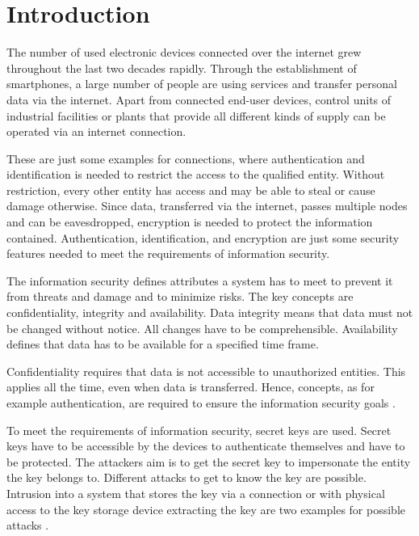 \chapter{Introduction}
\label{cap:introduction}

The number of used electronic devices connected over the internet grew throughout the last two decades rapidly.
Through the establishment of smartphones, a large number of people are using services and transfer personal data via the internet. %
Apart from connected end-user devices, control units of industrial facilities or plants that provide all different kinds of supply can be operated via an internet connection. %

These are just some examples for connections, where authentication and identification is needed to restrict the access to the qualified entity.
Without restriction, every other entity has access and may be able to steal or cause damage otherwise. %
Since data, transferred via the internet, passes multiple nodes and can be eavesdropped, encryption is needed to protect the information contained.
Authentication, identification, and encryption are just some security features needed to meet the requirements of information security.

The information security defines attributes a system has to meet to prevent it from threats and damage and to minimize risks.
The key concepts are confidentiality, integrity and availability. %
Data integrity means that data must not be changed without notice.
All changes have to be comprehensible.
Availability defines that data has to be available for a specified time frame. %

Confidentiality requires that data is not accessible to unauthorized entities.
This applies all the time, even when data is transferred.
Hence, concepts, as for example authentication, are required to ensure the information security goals \cite{2017InformationSecurity}.

To meet the requirements of information security, secret keys are used.
Secret keys have to be accessible by the devices to authenticate themselves and have to be protected. %
The attackers aim is to get the secret key to impersonate the entity the key belongs to.
Different attacks to get to know the key are possible.
Intrusion into a system that stores the key via a connection or with physical access to the key storage device extracting the key are two examples for possible attacks \cite{2016Attackcomputing,2017Side-channelAttack}.

